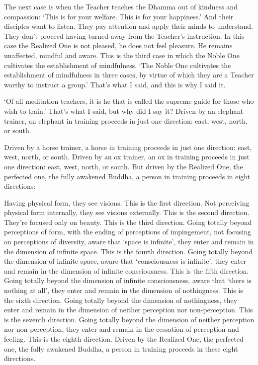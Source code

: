 \documentclass[12pt,openany]{book}%
\begin{document}
The next case is when the Teacher teaches the Dhamma out of kindness and compassion: ‘This is for your welfare. This is for your happiness.’ And their disciples want to listen. They pay attention and apply their minds to understand. They don’t proceed having turned away from the Teacher’s instruction. In this case the Realized One is not pleased, he does not feel pleasure. He remains unaffected, mindful and aware. This is the third case in which the Noble One cultivates the establishment of mindfulness. ‘The Noble One cultivates the establishment of mindfulness in three cases, by virtue of which they are a Teacher worthy to instruct a group.’ That’s what I said, and this is why I said it. 

‘Of all meditation teachers, it is he that is called the supreme guide for those who wish to train.’ That’s what I said, but why did I say it? Driven by an elephant trainer, an elephant in training proceeds in just one direction: east, west, north, or south. 

Driven by a horse trainer, a horse in training proceeds in just one direction: east, west, north, or south. Driven by an ox trainer, an ox in training proceeds in just one direction: east, west, north, or south. But driven by the Realized One, the perfected one, the fully awakened Buddha, a person in training proceeds in eight directions: 

Having physical form, they see visions. This is the first direction. Not perceiving physical form internally, they see visions externally. This is the second direction. They’re focused only on beauty. This is the third direction. Going totally beyond perceptions of form, with the ending of perceptions of impingement, not focusing on perceptions of diversity, aware that ‘space is infinite’, they enter and remain in the dimension of infinite space. This is the fourth direction. Going totally beyond the dimension of infinite space, aware that ‘consciousness is infinite’, they enter and remain in the dimension of infinite consciousness. This is the fifth direction. Going totally beyond the dimension of infinite consciousness, aware that ‘there is nothing at all’, they enter and remain in the dimension of nothingness. This is the sixth direction. Going totally beyond the dimension of nothingness, they enter and remain in the dimension of neither perception nor non-perception. This is the seventh direction. Going totally beyond the dimension of neither perception nor non-perception, they enter and remain in the cessation of perception and feeling. This is the eighth direction. Driven by the Realized One, the perfected one, the fully awakened Buddha, a person in training proceeds in these eight directions. 
\end{document}
